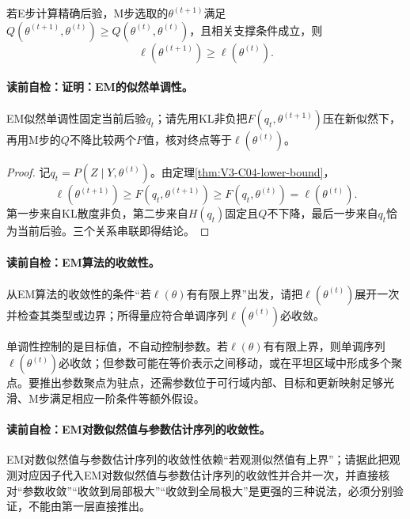\begin{theorem}[EM的似然单调性]\label{thm:V3-C04-monotone}
若E步计算精确后验，M步选取的$\theta^{(t+1)}$满足
$Q(\theta^{(t+1)},\theta^{(t)})\geq Q(\theta^{(t)},\theta^{(t)})$，且相关支撑条件成立，则
\[
\ell(\theta^{(t+1)})\geq\ell(\theta^{(t)}).
\]
\end{theorem}

\paragraph{读前自检：证明：EM的似然单调性。}EM似然单调性固定当前后验$q_t$；请先用KL非负把$F(q_t,\theta^{(t+1)})$压在新似然下，再用M步的$Q$不降比较两个$F$值，核对终点等于$\ell(\theta^{(t)})$。\par

\begin{proof}
记$q_t=P(Z\mid Y,\theta^{(t)})$。由定理\ref{thm:V3-C04-lower-bound}，
\[
\ell(\theta^{(t+1)})\geq F(q_t,\theta^{(t+1)})
\geq F(q_t,\theta^{(t)})=\ell(\theta^{(t)}).
\]
第一步来自KL散度非负，第二步来自$H(q_t)$固定且$Q$不下降，最后一步来自$q_t$恰为当前后验。三个关系串联即得结论。
\end{proof}

\paragraph{读前自检：EM算法的收敛性。}从EM算法的收敛性的条件“若$\ell(\theta)$有有限上界”出发，请把$\ell(\theta^{(t)})$展开一次并检查其类型或边界；所得量应符合单调序列$\ell(\theta^{(t)})$必收敛。\par

单调性控制的是目标值，不自动控制参数。若$\ell(\theta)$有有限上界，则单调序列$\ell(\theta^{(t)})$必收敛；但参数可能在等价表示之间移动，或在平坦区域中形成多个聚点。要推出参数聚点为驻点，还需参数位于可行域内部、目标和更新映射足够光滑、M步满足相应一阶条件等额外假设。

\paragraph{读前自检：EM对数似然值与参数估计序列的收敛性。}EM对数似然值与参数估计序列的收敛性依赖“若观测似然值有上界”；请据此把观测对应因子代入EM对数似然值与参数估计序列的收敛性并合并一次，并直接核对“参数收敛”“收敛到局部极大”“收敛到全局极大”是更强的三种说法，必须分别验证，不能由第一层直接推出。\par

